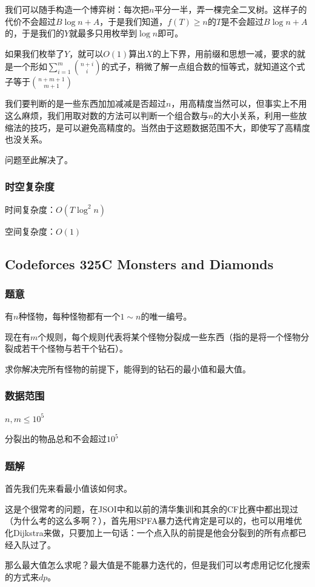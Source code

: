\documentclass{ctexart}
\begin{document}
我们可以随手构造一个博弈树：每次把$n$平分一半，弄一棵完全二叉树。这样子的代价不会超过$B \log n+A$，于是我们知道，$f(T)\ge n$的$T$是不会超过$B \log n+A$的，于是我们的$Y$就最多只用枚举到$\log n$即可。

如果我们枚举了$Y$，就可以$O(1)$算出$X$的上下界，用前缀和思想一减，要求的就是一个形如$\sum_{i=1}^m {{n+i} \choose {i}}$的式子，稍微了解一点组合数的恒等式，就知道这个式子等于${{n+m+1} \choose {m+1}}$

我们要判断的是一些东西加加减减是否超过$n$，用高精度当然可以，但事实上不用这么麻烦，我们用取对数的方法可以判断一个组合数与$n$的大小关系，利用一些放缩法的技巧，是可以避免高精度的。当然由于这题数据范围不大，即使写了高精度也没关系。

问题至此解决了。
\subsubsection{时空复杂度}
时间复杂度：$O(T\log^2 n)$

空间复杂度：$O(1)$
\subsection{Codeforces 325C Monsters and Diamonds}
\subsubsection{题意}
有$n$种怪物，每种怪物都有一个$1 \sim n$的唯一编号。

现在有$m$个规则，每个规则代表将某个怪物分裂成一些东西（指的是将一个怪物分裂成若干个怪物与若干个钻石）。

求你解决完所有怪物的前提下，能得到的钻石的最小值和最大值。
\subsubsection{数据范围}
$n,m \le 10^5$

分裂出的物品总和不会超过$10^5$
\subsubsection{题解}
首先我们先来看最小值该如何求。

这是个很常考的问题，在JSOI中和以前的清华集训和其余的CF比赛中都出现过（为什么考的这么多啊？），首先用SPFA暴力迭代肯定是可以的，也可以用堆优化Dijkstra来做，只要加上一句话：一个点入队的前提是他会分裂到的所有点都已经入队过了。

那么最大值怎么求呢？最大值是不能暴力迭代的，但是我们可以考虑用记忆化搜索的方式来$dp$。
\end{document}
